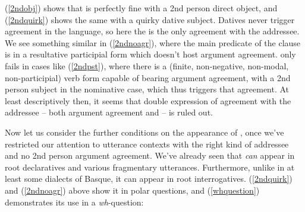 \documentclass[output=paper, modfonts, nonflat]{langsci/langscibook}
\begin{document}
\ea\label{2ndarg}
  \z
\z
%
(\ref{2ndobj}) shows that \allagr{} is perfectly fine with a 2nd
person direct object, and (\ref{2ndquirk}) shows the same with a
quirky dative subject. Datives never trigger agreement in the
language, so here the \allagr{} is the only agreement with the
addressee. We see something similar in (\ref{2ndnoagr}), where the
main predicate of the clause is in a resultative participial form
which doesn't host argument agreement. \allagr{} only fails in cases
like (\ref{2ndpst}), where there is a (finite, non-negative,
non-modal, non-participial) verb form capable of bearing argument
agreement, with a 2nd person subject in the nominative case, which
thus triggers that agreement. At least descriptively then, it seems
that double expression of agreement with the addressee -- both
argument agreement and \allagr{} -- is ruled out.%


Now let us consider the further conditions on the appearance of
\allagr, once we've restricted our attention to utterance contexts
with the right kind of addressee and no 2nd person argument agreement.
We've already seen that \allagr{} \emph{can} appear in root
declaratives and various fragmentary utterances. Furthermore, unlike
in at least some dialects of Basque, it can appear in root
interrogatives. (\ref{2ndquirk}) and (\ref{2ndnoagr}) above show it in
polar questions, and (\ref{whquestion}) demonstrates its use in a
\textit{wh}-question:
\end{document}
